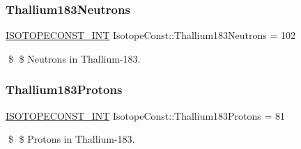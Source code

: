 \subsubsection{\texorpdfstring{Thallium183\+Neutrons}{Thallium183Neutrons}}
{\footnotesize\ttfamily \mbox{\hyperlink{group___isotope_const-_macros_ga5f18360b3e99483a35c32d789e62621c}{I\+S\+O\+T\+O\+P\+E\+C\+O\+N\+S\+T\+\_\+\+I\+NT}} Isotope\+Const\+::\+Thallium183\+Neutrons = 102}

\$ \$ Neutrons in Thallium-\/183. \mbox{\label{group___isotope_const-_thallium-_tl183_ga94788046122a5b51e6bc243fae086c2c}} 
\subsubsection{\texorpdfstring{Thallium183\+Protons}{Thallium183Protons}}
{\footnotesize\ttfamily \mbox{\hyperlink{group___isotope_const-_macros_ga5f18360b3e99483a35c32d789e62621c}{I\+S\+O\+T\+O\+P\+E\+C\+O\+N\+S\+T\+\_\+\+I\+NT}} Isotope\+Const\+::\+Thallium183\+Protons = 81}

\$ \$ Protons in Thallium-\/183. 